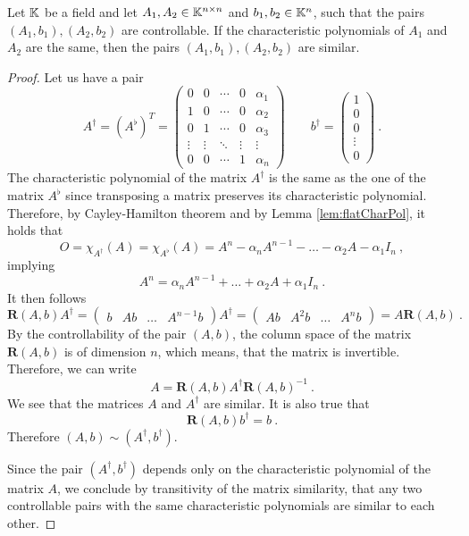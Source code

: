 \begin{lemma}
\label{lem:simCont}
    Let $\mathbb{K}$ be a field and let $A_1,A_2\in\mathbb{K}^{n\times n}$ and $b_1,b_2\in\mathbb{K}^n$, such that the pairs $(A_1,b_1),(A_2,b_2)$ are controllable. If the characteristic polynomials of $A_1$ and $A_2$ are the same, then the pairs $(A_1,b_1),(A_2,b_2)$ are similar.
\end{lemma}

\begin{proof}
    Let us have a pair
    $$A^\dagger=(A^\flat)^T=
    \begin{pmatrix}
        0 & 0 & \cdots & 0 & \alpha_1 \\
        1 & 0 & \cdots & 0 & \alpha_2 \\
        0 & 1 & \cdots & 0 & \alpha_3 \\
        \vdots & \vdots & \ddots & \vdots & \vdots \\
        0 & 0 & \cdots & 1 & \alpha_n
    \end{pmatrix}\qquad
    b^\dagger=
    \begin{pmatrix}
        1 \\ 0 \\ 0 \\ \vdots \\ 0
    \end{pmatrix}\ .$$
    The characteristic polynomial of the matrix $A^\dagger$ is the same as the one of the matrix $A^\flat$ since transposing a matrix preserves its characteristic polynomial. Therefore, by Cayley-Hamilton theorem and by Lemma \ref{lem:flatCharPol}, it holds that
    $$O=\chi_{A^\dagger}(A)=\chi_{A^\flat}(A)=A^n-\alpha_nA^{n-1}-\ldots-\alpha_2A-\alpha_1I_n\ ,$$
    implying
    $$A^n=\alpha_nA^{n-1}+\ldots+\alpha_2A+\alpha_1I_n\ .$$
    It then follows 
    $$\mathbf{R}(A,b)A^\dagger=
        \begin{pmatrix} 
            b & Ab & \ldots & A^{n-1}b
        \end{pmatrix}
    A^\dagger=
        \begin{pmatrix}
            Ab & A^2b & \ldots & A^nb
        \end{pmatrix}
    =A\mathbf{R}(A,b)\ .$$
    By the controllability of the pair $(A,b)$, the column space of the matrix $\mathbf{R}(A,b)$ is of dimension $n$, which means, that the matrix is invertible. Therefore, we can write 
    $$A=\mathbf{R}(A,b)A^\dagger\mathbf{R}(A,b)^{-1}\ .$$
    We see that the matrices $A$ and $A^\dagger$ are similar. It is also true that $$\mathbf{R}(A,b)b^\dagger=b\ .$$ Therefore $(A,b)\sim(A^\dagger,b^\dagger)$.

    Since the pair $(A^\dagger,b^\dagger)$ depends only on the characteristic polynomial of the matrix $A$, we conclude by transitivity of the matrix similarity, that any two controllable pairs with the same characteristic polynomials are similar to each other.
\end{proof}

